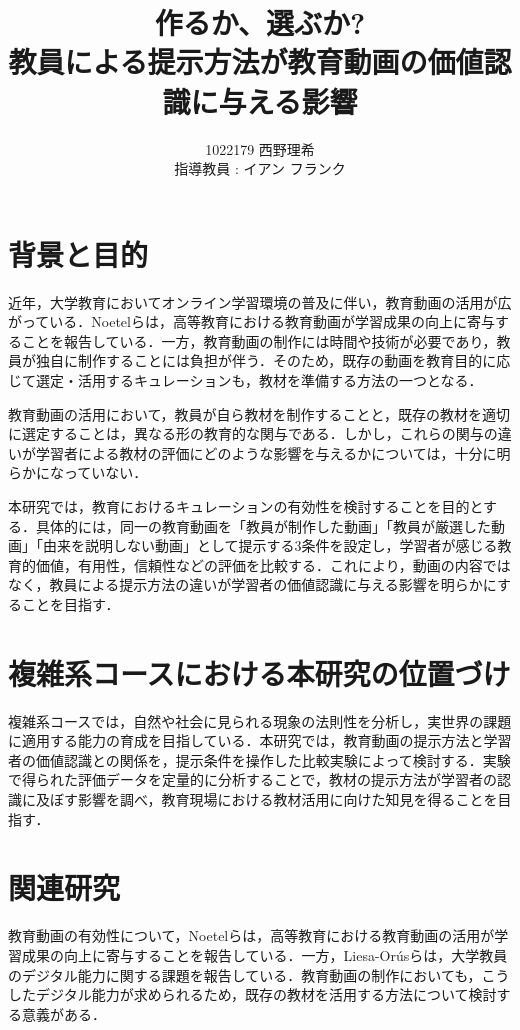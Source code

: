 \documentclass[11pt]{ltjarticle}
\author{%
1022179 西野理希\\指導教員 : イアン フランク
}
\title{作るか、選ぶか?\\教員による提示方法が教育動画の価値認識に与える影響}
\begin{document}
\maketitle

\section{背景と目的}

近年，大学教育においてオンライン学習環境の普及に伴い，教育動画の活用が広がっている．Noetelら\cite{noetel2021}は，高等教育における教育動画が学習成果の向上に寄与することを報告している．一方，教育動画の制作には時間や技術が必要であり，教員が独自に制作することには負担が伴う．そのため，既存の動画を教育目的に応じて選定・活用するキュレーションも，教材を準備する方法の一つとなる．

教育動画の活用において，教員が自ら教材を制作することと，既存の教材を適切に選定することは，異なる形の教育的な関与である．しかし，これらの関与の違いが学習者による教材の評価にどのような影響を与えるかについては，十分に明らかになっていない．

本研究では，教育におけるキュレーションの有効性を検討することを目的とする．具体的には，同一の教育動画を「教員が制作した動画」「教員が厳選した動画」「由来を説明しない動画」として提示する3条件を設定し，学習者が感じる教育的価値，有用性，信頼性などの評価を比較する．これにより，動画の内容ではなく，教員による提示方法の違いが学習者の価値認識に与える影響を明らかにすることを目指す．

\section{複雑系コースにおける本研究の位置づけ}
複雑系コースでは，自然や社会に見られる現象の法則性を分析し，実世界の課題に適用する能力の育成を目指している．本研究では，教育動画の提示方法と学習者の価値認識との関係を，提示条件を操作した比較実験によって検討する．実験で得られた評価データを定量的に分析することで，教材の提示方法が学習者の認識に及ぼす影響を調べ，教育現場における教材活用に向けた知見を得ることを目指す．

\section{関連研究}

教育動画の有効性について，Noetelら\cite{noetel2021}は，高等教育における教育動画の活用が学習成果の向上に寄与することを報告している．一方，Liesa-Orúsら\cite{liesa2023}は，大学教員のデジタル能力に関する課題を報告している．教育動画の制作においても，こうしたデジタル能力が求められるため，既存の教材を活用する方法について検討する意義がある．
\end{document}

